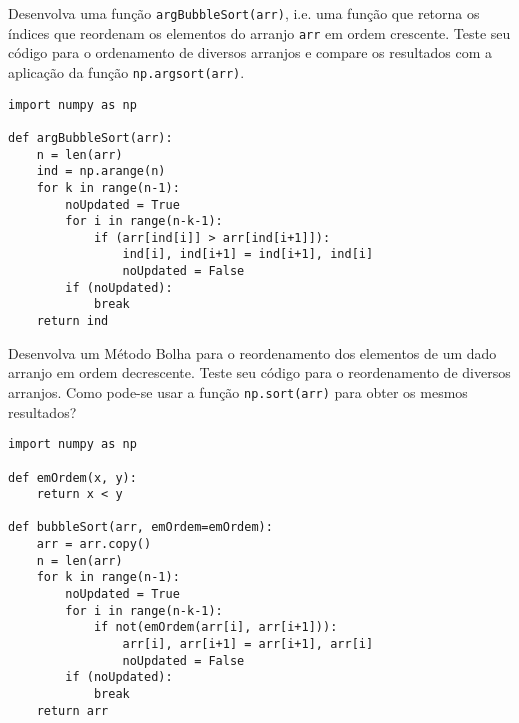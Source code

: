 \begin{exer}
  Desenvolva uma função \lstinline+argBubbleSort(arr)+, i.e. uma função que retorna os índices que reordenam os elementos do arranjo \lstinline+arr+ em ordem crescente. Teste seu código para o ordenamento de diversos arranjos e compare os resultados com a aplicação da função \lstinline+np.argsort(arr)+.
\end{exer}
\begin{resp}

\begin{lstlisting}
import numpy as np

def argBubbleSort(arr):
    n = len(arr)
    ind = np.arange(n)
    for k in range(n-1):
        noUpdated = True
        for i in range(n-k-1):
            if (arr[ind[i]] > arr[ind[i+1]]):
                ind[i], ind[i+1] = ind[i+1], ind[i]
                noUpdated = False
        if (noUpdated):
            break
    return ind
\end{lstlisting}

\end{resp}

\begin{exer}
  Desenvolva um Método Bolha para o reordenamento dos elementos de um dado arranjo em ordem decrescente. Teste seu código para o reordenamento de diversos arranjos. Como pode-se usar a função \lstinline+np.sort(arr)+ para obter os mesmos resultados?
\end{exer}
\begin{resp}

\begin{lstlisting}
import numpy as np

def emOrdem(x, y):
    return x < y

def bubbleSort(arr, emOrdem=emOrdem):
    arr = arr.copy()
    n = len(arr)
    for k in range(n-1):
        noUpdated = True
        for i in range(n-k-1):
            if not(emOrdem(arr[i], arr[i+1])):
                arr[i], arr[i+1] = arr[i+1], arr[i]
                noUpdated = False
        if (noUpdated):
            break
    return arr
\end{lstlisting}

\end{resp}


